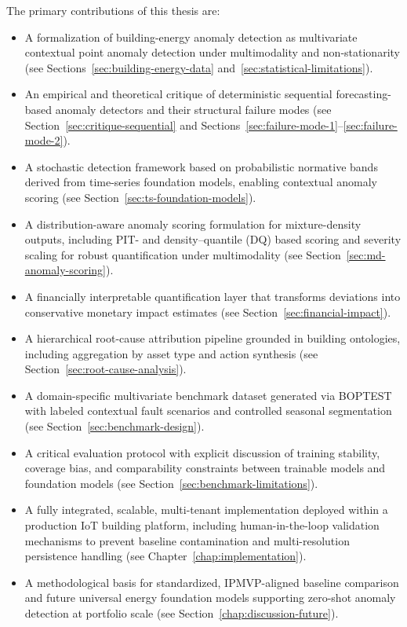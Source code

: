 The primary contributions of this thesis are:
\begin{itemize}
  \item A formalization of building-energy anomaly detection as multivariate contextual
  point anomaly detection under multimodality and non-stationarity (see
  Sections~\ref{sec:building-energy-data} and~\ref{sec:statistical-limitations}).

  \item An empirical and theoretical critique of deterministic sequential
  forecasting-based anomaly detectors and their structural failure modes (see
  Section~\ref{sec:critique-sequential} and
  Sections~\ref{sec:failure-mode-1}--\ref{sec:failure-mode-2}).

  \item A stochastic detection framework based on probabilistic normative bands derived
  from time-series foundation models, enabling contextual anomaly scoring (see
  Section~\ref{sec:ts-foundation-models}).

  \item A distribution-aware anomaly scoring formulation for mixture-density outputs,
  including PIT- and density--quantile (DQ) based scoring and severity scaling for
  robust quantification under multimodality (see Section~\ref{sec:md-anomaly-scoring}).

  \item A financially interpretable quantification layer that transforms deviations
  into conservative monetary impact estimates (see Section~\ref{sec:financial-impact}).

  \item A hierarchical root-cause attribution pipeline grounded in building ontologies,
  including aggregation by asset type and action synthesis (see
  Section~\ref{sec:root-cause-analysis}).

  \item A domain-specific multivariate benchmark dataset generated via \ac{BOPTEST} with
  labeled contextual fault scenarios and controlled seasonal segmentation (see
  Section~\ref{sec:benchmark-design}).

  \item A critical evaluation protocol with explicit discussion of training stability,
  coverage bias, and comparability constraints between trainable models and foundation
  models (see Section~\ref{sec:benchmark-limitations}).

  \item A fully integrated, scalable, multi-tenant implementation deployed within a
  production IoT building platform, including human-in-the-loop validation mechanisms
  to prevent baseline contamination and multi-resolution persistence handling (see
  Chapter~\ref{chap:implementation}).

  \item A methodological basis for standardized, \ac{IPMVP}-aligned baseline comparison
  and future universal energy foundation models supporting zero-shot anomaly detection
  at portfolio scale (see Section~\ref{chap:discussion-future}).
\end{itemize}

